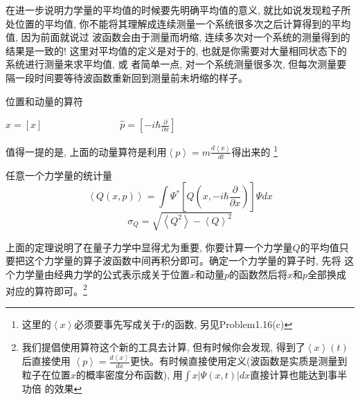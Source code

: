 \documentclass[a4paper,zihao=-4,linespread=1]{ctexrep}
\newenvironment{lequation}{\large\begin{equation}}{\end{equation}}
\begin{document}
    在进一步说明力学量的平均值的时候要先明确平均值的意义, 就比如说发现粒子所处位置的平均值, 你不能将其理解成连续测量一个系统很多次之后计算得到的平均值, 因为前面就说过
    波函数会由于测量而坍缩, 连续多次对一个系统的测量得到的结果是一致的! 这里对平均值的定义是对于的, 也就是你需要对大量相同状态下的系统进行测量来求平均值, 或
    者简单一点, 对一个系统测量很多次, 但每次测量要隔一段时间要等待波函数重新回到测量前未坍缩的样子。
    \begin{proposition}{位置和动量的算符}
        \begin{center}
            \begin{math}
                \displaystyle
                \hat{x}=[x] \qquad\qquad\qquad\qquad \hat{p}=\left[-i\hbar\frac{\partial}{\partial x}\right]    
            \end{math}
        \end{center}
        值得一提的是, 上面的动量算符是利用$\left \langle p \right \rangle=m\frac{d\left \langle x \right \rangle}{dt}$得出来的
        \footnote[0]{这里的$\left \langle x \right \rangle$必须要事先写成关于$t$的函数, 另见Problem1.16(c)}
    \end{proposition}
    \begin{theorem}{任意一个力学量的统计量}
        \begin{lequation}
            \left \langle Q\left(x,p\right) \right \rangle=\int \Psi^{*}\left[Q\left(x,-i\hbar\frac{\partial}{\partial x}\right)\right]\Psi dx
        \end{lequation}
        \begin{equation}
            \sigma_Q = \sqrt{\left \langle Q^2 \right \rangle-\left \langle Q \right \rangle^2}
        \end{equation}
    \end{theorem}
    上面的定理说明了在量子力学中显得尤为重要, 你要计算一个力学量$Q$的平均值只要把这个力学量的算子波函数中间再积分即可。确定一个力学量的算子时, 先将
    这个力学量由经典力学的公式表示成关于位置$x$和动量$p$的函数然后将$x$和$p$全部换成对应的算符即可。\footnote[1]{我们提倡使用算符这个新的工具去计算, 但有时候你会发现, 得到了$\left \langle x \right \rangle(t) $后直接使用
    $\left \langle p \right \rangle=\frac{d\left \langle x \right \rangle}{dx}$更快。有时候直接使用定义(波函数是实质是测量到粒子在位置$x$的概率密度分布函数), 用$\int x\left| \Psi(x,t)\right|dx$直接计算也能达到事半功倍
    的效果}
\end{document}
